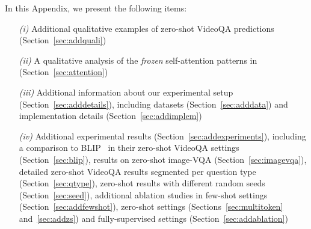 In this Appendix, we present the following items:
\begin{itemize}
\item[\textit{(i)}] Additional qualitative examples of zero-shot VideoQA predictions (Section~\ref{sec:addquali})
\item[\textit{(ii)}] A qualitative analysis of the \emph{frozen} self-attention patterns in \model{} (Section~\ref{sec:attention})
\item[\textit{(iii)}] Additional information about our experimental setup (Section~\ref{sec:adddetails}), including datasets (Section~\ref{sec:adddata}) and implementation details (Section~\ref{sec:addimplem})
\item[\textit{(iv)}] Additional experimental results (Section~\ref{sec:addexperiments}), including a comparison to BLIP~\cite{li2022blip} in their zero-shot VideoQA settings (Section~\ref{sec:blip}), results on zero-shot image-VQA (Section~\ref{sec:imagevqa}), detailed zero-shot VideoQA results segmented per question type (Section~\ref{sec:qtype}), zero-shot results with different random seeds (Section~\ref{sec:seed}), additional ablation studies in few-shot settings (Section~\ref{sec:addfewshot}), zero-shot settings (Sections~\ref{sec:multitoken} and~\ref{sec:addzs}) and fully-supervised settings (Section~\ref{sec:addablation})
\end{itemize}

